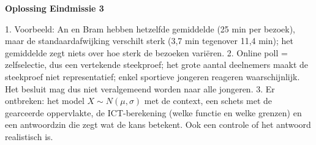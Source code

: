 \begin{oplossing}
\textbf{Oplossing Eindmissie 3}

1. Voorbeeld: An en Bram hebben hetzelfde gemiddelde (25 min per bezoek), maar de standaardafwijking verschilt sterk (3,7 min tegenover 11,4 min); het gemiddelde zegt niets over hoe sterk de bezoeken variëren. 2. Online poll = zelfselectie, dus een vertekende steekproef; het grote aantal deelnemers maakt de steekproef niet representatief; enkel sportieve jongeren reageren waarschijnlijk. Het besluit mag dus niet veralgemeend worden naar alle jongeren. 3. Er ontbreken: het model $X\sim N(\mu,\sigma)$ met de context, een schets met de gearceerde oppervlakte, de ICT-berekening (welke functie en welke grenzen) en een antwoordzin die zegt wat de kans betekent. Ook een controle of het antwoord realistisch is.
\end{oplossing}
